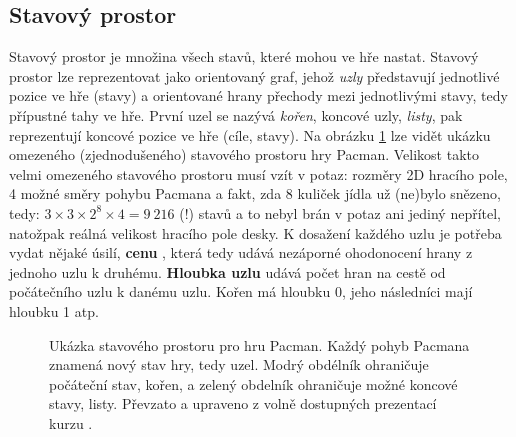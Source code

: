 \subsection*{Stavový prostor}
Stavový prostor \cite{AI1} je množina všech stavů, které mohou ve hře nastat. Stavový prostor lze reprezentovat jako orientovaný graf, jehož \textit{uzly} představují jednotlivé pozice ve hře (stavy) a orientované hrany přechody mezi jednotlivými stavy, tedy přípustné tahy ve hře. První uzel se nazývá \textit{kořen}, koncové uzly, \textit{listy}, pak reprezentují koncové pozice ve hře (cíle, stavy). Na obrázku \ref{img:stavp} lze vidět ukázku omezeného (zjednodušeného) stavového prostoru hry Pacman. Velikost takto velmi omezeného stavového prostoru musí vzít v potaz: rozměry 2D hracího pole, 4 možné směry pohybu Pacmana a fakt, zda 8 kuliček jídla už (ne)bylo snězeno, tedy:  $3 \times 3 \times 2^{8} \times 4 = 9\:216$ (!) stavů a to nebyl brán v potaz ani jediný nepřítel, natožpak reálná velikost hracího pole desky.
\newline
K dosažení každého uzlu je potřeba vydat nějaké úsilí, \textbf{cenu} \cite{AI1}, která tedy udává nezáporné ohodonocení hrany z jednoho uzlu k druhému. \textbf{Hloubka uzlu} \cite{AI1} udává počet hran na cestě od počátečního uzlu k danému uzlu. Kořen má hloubku 0, jeho následníci mají hloubku 1 atp.


\begin{figure}[h]
\begin{center}
  \caption{Ukázka stavového prostoru pro hru Pacman. Každý pohyb Pacmana znamená nový stav hry, tedy uzel. Modrý obdélník ohraničuje počáteční stav, kořen, a zelený obdelník ohraničuje možné koncové stavy, listy. Převzato a upraveno z volně dostupných prezentací kurzu \cite{berkeley}.}
  \label{img:stavp}
\end{center}
\end{figure}

